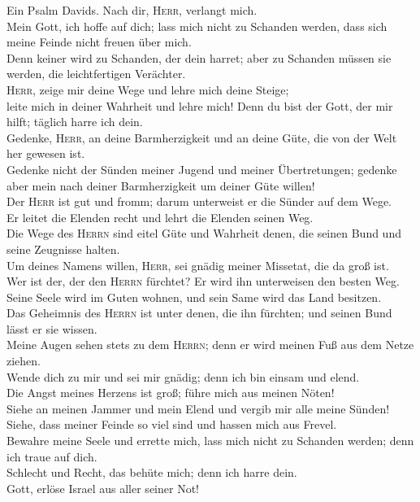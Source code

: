  Ein Psalm Davids. Nach dir, \textsc{Herr}, verlangt
mich.\\
 Mein Gott, ich hoffe auf dich; lass mich nicht zu
Schanden werden, dass sich meine Feinde nicht freuen über mich.\\
 Denn keiner wird zu Schanden, der dein harret; aber zu
Schanden müssen sie werden, die leichtfertigen Verächter.\\
 \textsc{Herr}, zeige mir deine Wege und lehre mich deine
Steige;\\
 leite mich in deiner Wahrheit und lehre mich! Denn du
bist der Gott, der mir hilft; täglich harre ich dein.\\
 Gedenke, \textsc{Herr}, an deine Barmherzigkeit und an
deine Güte, die von der Welt her gewesen ist.\\
 Gedenke nicht der Sünden meiner Jugend und meiner
Übertretungen; gedenke aber mein nach deiner Barmherzigkeit um deiner
Güte willen!\\
 Der \textsc{Herr} ist gut und fromm; darum unterweist er
die Sünder auf dem Wege.\\
 Er leitet die Elenden recht und lehrt die Elenden seinen
Weg.\\
 Die Wege des \textsc{Herrn} sind eitel Güte und Wahrheit
denen, die seinen Bund und seine Zeugnisse halten.\\
 Um deines Namens willen, \textsc{Herr}, sei gnädig
meiner Missetat, die da groß ist.\\
 Wer ist der, der den \textsc{Herrn} fürchtet? Er wird
ihn unterweisen den besten Weg.\\
 Seine Seele wird im Guten wohnen, und sein Same wird das
Land besitzen.\\
 Das Geheimnis des \textsc{Herrn} ist unter denen, die
ihn fürchten; und seinen Bund lässt er sie wissen.\\
 Meine Augen sehen stets zu dem \textsc{Herrn}; denn er
wird meinen Fuß aus dem Netze ziehen.\\
 Wende dich zu mir und sei mir gnädig; denn ich bin
einsam und elend.\\
 Die Angst meines Herzens ist groß; führe mich aus meinen
Nöten!\\
 Siehe an meinen Jammer und mein Elend und vergib mir
alle meine Sünden!\\
 Siehe, dass meiner Feinde so viel sind und hassen mich
aus Frevel.\\
 Bewahre meine Seele und errette mich, lass mich nicht zu
Schanden werden; denn ich traue auf dich.\\
 Schlecht und Recht, das behüte mich; denn ich harre
dein.\\
 Gott, erlöse Israel aus aller seiner Not!

